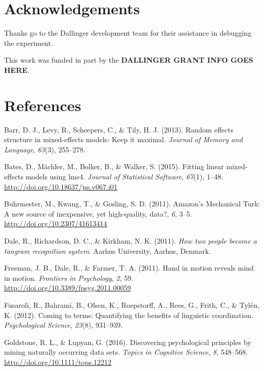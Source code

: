 \documentclass[10pt, letterpaper]{article}
\begin{document}
\section{Acknowledgements}\label{acknowledgements}

Thanks go to the Dallinger development team for their assistance in
debugging the experiment.

This work was funded in part by the \textbf{DALLINGER GRANT INFO GOES
HERE}.

\section{References}\label{references}

\setlength{\parindent}{-0.1in} \setlength{\leftskip}{0.125in} \noindent

\hypertarget{refs}{}
\hypertarget{ref-barr2013random}{}
Barr, D. J., Levy, R., Scheepers, C., \& Tily, H. J. (2013). Random
effects structure in mixed-effects models: Keep it maximal.
\emph{Journal of Memory and Language}, \emph{63}(3), 255--278.

\hypertarget{ref-bates2015fitting}{}
Bates, D., Mächler, M., Bolker, B., \& Walker, S. (2015). Fitting linear
mixed-effects models using lme4. \emph{Journal of Statistical Software},
\emph{67}(1), 1--48. \url{http://doi.org/10.18637/jss.v067.i01}

\hypertarget{ref-buhrmester2011amazon}{}
Buhrmester, M., Kwang, T., \& Gosling, S. D. (2011). Amazon's Mechanical
Turk: A new source of inexpensive, yet high-quality, data?, \emph{6},
3--5. \url{http://doi.org/10.2307/41613414}

\hypertarget{ref-dale2011how}{}
Dale, R., Richardson, D. C., \& Kirkham, N. K. (2011). \emph{How two
people become a tangram recognition system}. Aarhus University, Aarhus,
Denmark.

\hypertarget{ref-freeman2011hand}{}
Freeman, J. B., Dale, R., \& Farmer, T. A. (2011). Hand in motion
reveals mind in motion. \emph{Frontiers in Psychology}, \emph{2}, 59.
\url{http://doi.org/10.3389/fpsyg.2011.00059}

\hypertarget{ref-fusaroli2012coming}{}
Fusaroli, R., Bahrami, B., Olsen, K., Roepstorff, A., Rees, G., Frith,
C., \& Tylén, K. (2012). Coming to terms: Quantifying the benefits of
linguistic coordination. \emph{Psychological Science}, \emph{23}(8),
931--939.

\hypertarget{ref-goldstone2016discovering}{}
Goldstone, R. L., \& Lupyan, G. (2016). Discovering psychological
principles by mining naturally occurring data sets. \emph{Topics in
Cognitive Science}, \emph{8}, 548--568.
\url{http://doi.org/10.1111/tops.12212}
\end{document}
